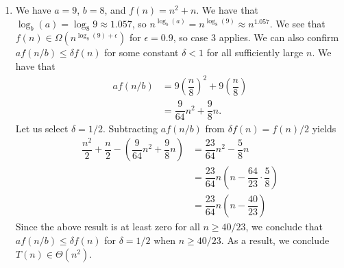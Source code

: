\documentclass[11pt, letterpaper, titlepage]{article}
\begin{document}
\begin{enumerate}[label=\alph*)]
    \item We have $a = 9$, $b = 8$, and $f(n) = n^2 + n$. We have that $\log_b(a) = \log_8{9} \approx 1.057$, so $n^{\log_b(a)} = n^{\log_8(9)} \approx n^{1.057}$. We see that $f(n) \in \Omega(n^{\log_8(9) + \epsilon})$ for $\epsilon = 0.9$, so case 3 applies. We can also confirm $af(n/b) \leq \delta f(n)$ for some constant $\delta < 1$ for all sufficiently large $n$. We have that 
    \begin{align}
        af(n/b) &= 9\left(\dfrac{n}{8}\right)^2 + 9\left(\dfrac{n}{8}\right) \\
        &= \dfrac{9}{64}n^2 + \dfrac{9}{8}n.
    \end{align}
    Let us select $\delta = 1/2$. Subtracting $af(n/b)$ from $\delta f(n) = f(n) / 2$ yields 
    \begin{align}
        \dfrac{n^2}{2} + \dfrac{n}{2} - \left(\dfrac{9}{64}n^2 + \dfrac{9}{8}n\right) &= \dfrac{23}{64}n^2 - \dfrac{5}{8}n \\
        &= \dfrac{23}{64}n\left(n - \dfrac{64}{23} \cdot \dfrac{5}{8}\right) \\
        &= \dfrac{23}{64}n\left(n - \dfrac{40}{23}\right)
    \end{align}
    Since the above result is at least zero for all $n \geq 40/23$, we conclude that $af(n/b) \leq \delta f(n)$ for $\delta = 1/2$ when $n \geq 40/23$. As a result, we conclude $T(n) \in \Theta(n^2)$.
\end{enumerate}

\newpage
\end{document}
